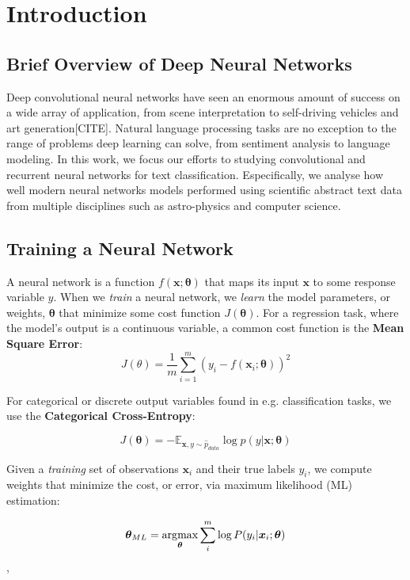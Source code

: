 
\chapter{Introduction}

\section{Brief Overview of Deep Neural Networks}
Deep convolutional neural networks have seen an enormous amount of success on a wide array of application, from
scene interpretation to self-driving vehicles and art generation[CITE]. Natural language processing tasks are no exception to the
range of problems deep learning can solve, from sentiment analysis to language modeling. In this work, we focus our efforts to studying
convolutional and recurrent neural networks for text classification. Especifically, we analyse how well modern neural networks models performed
using scientific abstract text data from multiple disciplines such as astro-physics and computer science.

\section{Training a Neural Network}

A neural network is a function $f(\bm{x};\bm{\theta})$ that maps its input $\bm{x}$ to some response variable $y$. When we \textit{train} a
neural network, we \textit{learn} the model parameters, or weights, $\bm{\theta}$ that minimize some cost function $J(\bm{\theta})$.
For a regression task, where the model's output is a continuous variable, a common cost function is the \textbf{Mean Square Error}:
\[J(\theta) = \frac{1}{m}\sum_{i=1}^{m}(y_{i} - f(\bm{x}_{i};\bm{\theta}))^{2}\]

For categorical or discrete output variables found in e.g. classification tasks, we use the \textbf{Categorical Cross-Entropy}:

\[J(\bm{\theta}) = -\mathbb{E}_{\bm{x},y \sim \hat p_{data}} \log \textit{p}(y|\bm{x};\bm{\theta})\]

Given a \textit{training} set of observations $\bm{x}_i$ and their true labels $y_i$, we compute weights that minimize the cost, or error, via
maximum likelihood (ML) estimation:

\[\bm{\theta}_{ML} = \operatorname*{\arg\!\max}_{\bm{\theta}} \sum_{i}^{m} \log P(y_{i}|\bm{x}_{i};\bm{\theta})\],

